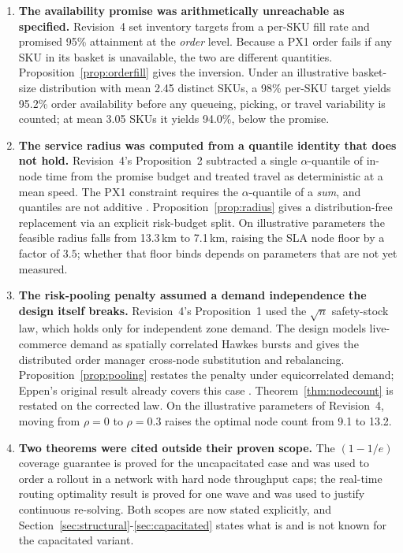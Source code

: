 \documentclass[10pt,twocolumn,letterpaper]{article}
\theoremstyle{definition}
\begin{document}
\begin{enumerate}
\item \textbf{The availability promise was arithmetically unreachable as specified.} Revision~4 set inventory targets from a per-SKU fill rate and promised 95\% attainment at the \emph{order} level. Because a PX1 order fails if any SKU in its basket is unavailable, the two are different quantities. Proposition~\ref{prop:orderfill} gives the inversion. Under an illustrative basket-size distribution with mean 2.45 distinct SKUs, a 98\% per-SKU target yields 95.2\% order availability before any queueing, picking, or travel variability is counted; at mean 3.05 SKUs it yields 94.0\%, below the promise.
\item \textbf{The service radius was computed from a quantile identity that does not hold.} Revision~4's Proposition~2 subtracted a single $\alpha$-quantile of in-node time from the promise budget and treated travel as deterministic at a mean speed. The PX1 constraint requires the $\alpha$-quantile of a \emph{sum}, and quantiles are not additive \cite{artzner1999,embrechts2002}. Proposition~\ref{prop:radius} gives a distribution-free replacement via an explicit risk-budget split. On illustrative parameters the feasible radius falls from 13.3\,km to 7.1\,km, raising the SLA node floor by a factor of $3.5$; whether that floor binds depends on parameters that are not yet measured.
\item \textbf{The risk-pooling penalty assumed a demand independence the design itself breaks.} Revision~4's Proposition~1 used the $\sqrt{n}$ safety-stock law, which holds only for independent zone demand. The design models live-commerce demand as spatially correlated Hawkes bursts and gives the distributed order manager cross-node substitution and rebalancing. Proposition~\ref{prop:pooling} restates the penalty under equicorrelated demand; Eppen's original result already covers this case \cite{eppen1979}. Theorem~\ref{thm:nodecount} is restated on the corrected law. On the illustrative parameters of Revision~4, moving from $\rho=0$ to $\rho=0.3$ raises the optimal node count from 9.1 to 13.2.
\item \textbf{Two theorems were cited outside their proven scope.} The $(1-1/e)$ coverage guarantee is proved for the uncapacitated case and was used to order a rollout in a network with hard node throughput caps; the real-time routing optimality result is proved for one wave and was used to justify continuous re-solving. Both scopes are now stated explicitly, and Section~\ref{sec:structural}-\ref{sec:capacitated} states what is and is not known for the capacitated variant.

\end{enumerate}
\end{document}
